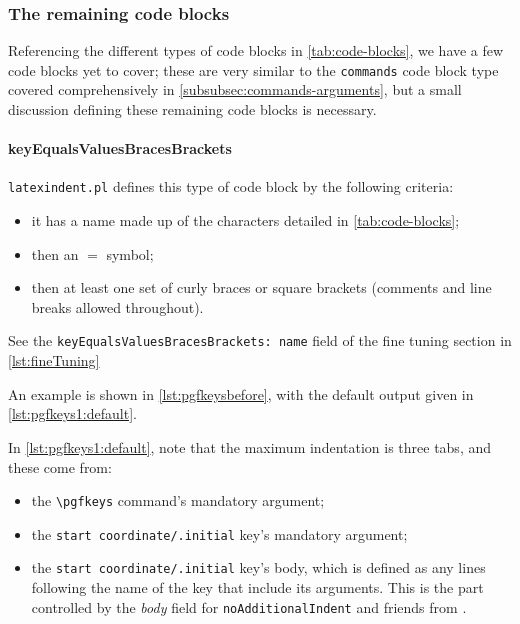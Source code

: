 \subsubsection{The remaining code blocks}
 Referencing the different types of code blocks in \vref{tab:code-blocks}, we have a few
 code blocks yet to cover; these are very similar to the \texttt{commands} code block
 type covered comprehensively in \vref{subsubsec:commands-arguments}, but a small
 discussion defining these remaining code blocks is necessary.

 \paragraph{keyEqualsValuesBracesBrackets}
  \texttt{latexindent.pl} defines this type of code block by the following criteria:
  \begin{itemize}
   \item it has a name made up of the characters detailed in \vref{tab:code-blocks};
   \item then an $=$ symbol;
   \item then at least one set of curly braces or square brackets (comments and line
         breaks allowed throughout).
  \end{itemize}
  See the \texttt{keyEqualsValuesBracesBrackets: name} field of the fine tuning section
  in \vref{lst:fineTuning} %

  \begin{example}
  An example is shown in \cref{lst:pgfkeysbefore}, with the default output given in
  \cref{lst:pgfkeys1:default}.

  \begin{cmhtcbraster}
  \end{cmhtcbraster}

  In \cref{lst:pgfkeys1:default}, note that the maximum indentation is three tabs, and
  these come from:
  \begin{itemize}
   \item the \lstinline!\pgfkeys! command's mandatory argument;
   \item the \lstinline!start coordinate/.initial! key's mandatory argument;
   \item the \lstinline!start coordinate/.initial! key's body, which is defined as any
         lines following the name of the key that include its arguments. This is the part
         controlled by the \emph{body} field for \texttt{noAdditionalIndent} and friends
         from .
  \end{itemize}
  \end{example}

